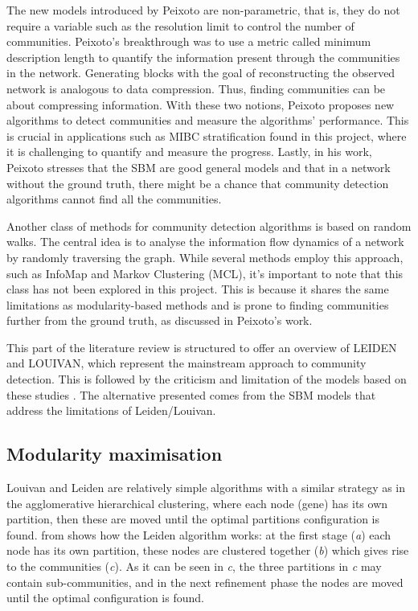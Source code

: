 The new models introduced by Peixoto are non-parametric, that is, they do not require a variable such as the resolution limit to control the number of communities. Peixoto's breakthrough was to use a metric called minimum description length to quantify the information present through the communities in the network. Generating blocks with the goal of reconstructing the observed network is analogous to data compression. Thus, finding communities can be about compressing information. With these two notions, Peixoto proposes new algorithms to detect communities and measure the algorithms' performance. This is crucial in applications such as MIBC stratification found in this project, where it is challenging to quantify and measure the progress. Lastly, in his work, Peixoto stresses that the SBM are good general models and that in a network without the ground truth, there might be a chance that community detection algorithms cannot find all the communities.

Another class of methods for community detection algorithms is based on random walks. The central idea is to analyse the information flow dynamics of a network by randomly traversing the graph. While several methods employ this approach, such as InfoMap and Markov Clustering (MCL), it's important to note that this class has not been explored in this project. This is because it shares the same limitations as modularity-based methods and is prone to finding communities further from the ground truth, as discussed in Peixoto's work. 

This part of the literature review is structured to offer an overview of \gls{LEIDEN} and \gls{LOUIVAN}, which represent the mainstream approach to community detection. This is followed by the criticism and limitation of the models based on these studies \citep{Peixoto2023-se, Peixoto2023-se, Shemirani2023-ww}. The alternative presented comes from the SBM models that address the limitations of Leiden/Louivan.


\subsection{Modularity maximisation} \label{s:lit:mod_max}

Louivan \citep{Blondel2008-ik} and Leiden \citep{Traag2019-ne} are relatively simple algorithms with a similar strategy as in the agglomerative hierarchical clustering, where each node (gene) has its own partition, then these are moved until the optimal partitions configuration is found.  from \cite{Traag2019-ne} shows how the Leiden algorithm works: at the first stage (\textit{a}) each node has its own partition, these nodes are clustered together (\textit{b}) which gives rise to the communities (\textit{c}). As it can be seen in \textit{c}, the three partitions in \textit{c} may contain sub-communities, and in the next refinement phase the nodes are moved until the optimal configuration is found.

